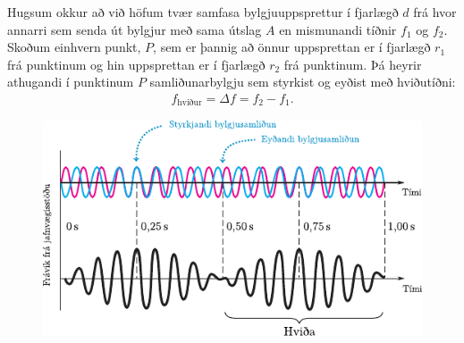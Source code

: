 \begin{tcolorbox}
\begin{theorem}
Hugsum okkur að við höfum tvær samfasa bylgjuuppsprettur í fjarlægð $d$ frá hvor annarri sem senda út bylgjur með sama útslag $A$ en mismunandi tíðnir $f_1$ og $f_2$. Skoðum einhvern punkt, $P$, sem er þannig að önnur uppsprettan er í fjarlægð $r_1$ frá punktinum og hin uppsprettan er í fjarlægð $r_2$ frá punktinum. Þá heyrir athugandi í punktinum $P$ samliðunarbylgju sem styrkist og eyðist með hviðutíðni:
\begin{align*}
    f_{\text{hviður}} = \Delta f = f_2 - f_1.
\end{align*}
\begin{figure}[H]
    \centering
    \includegraphics{figures/hvidur.pdf}
\end{figure}
\end{theorem}
\end{tcolorbox}


